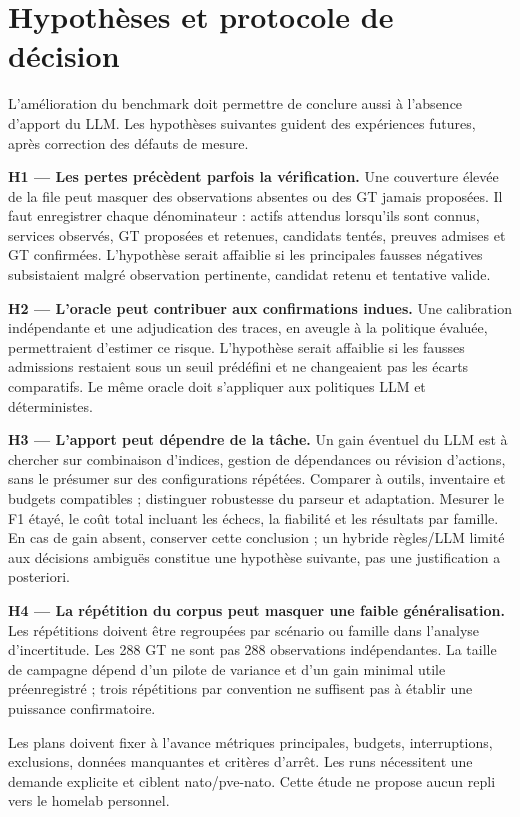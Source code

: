 \documentclass[11pt,a4paper]{article}
\begin{document}
\section{Hypothèses et protocole de décision}
\label{sec:protocol}
L'amélioration du benchmark doit permettre de conclure aussi à l'absence d'apport du LLM. Les hypothèses suivantes guident des expériences futures, après correction des défauts de mesure.

\textbf{H1 --- Les pertes précèdent parfois la vérification.} Une couverture élevée de la file peut masquer des observations absentes ou des GT jamais proposées. Il faut enregistrer chaque dénominateur : actifs attendus lorsqu'ils sont connus, services observés, GT proposées et retenues, candidats tentés, preuves admises et GT confirmées. L'hypothèse serait affaiblie si les principales fausses négatives subsistaient malgré observation pertinente, candidat retenu et tentative valide.

\textbf{H2 --- L'oracle peut contribuer aux confirmations indues.} Une calibration indépendante et une adjudication des traces, en aveugle à la politique évaluée, permettraient d'estimer ce risque. L'hypothèse serait affaiblie si les fausses admissions restaient sous un seuil prédéfini et ne changeaient pas les écarts comparatifs. Le même oracle doit s'appliquer aux politiques LLM et déterministes.

\textbf{H3 --- L'apport peut dépendre de la tâche.} Un gain éventuel du LLM est à chercher sur combinaison d'indices, gestion de dépendances ou révision d'actions, sans le présumer sur des configurations répétées. Comparer à outils, inventaire et budgets compatibles ; distinguer robustesse du parseur et adaptation. Mesurer le F1 étayé, le coût total incluant les échecs, la fiabilité et les résultats par famille. En cas de gain absent, conserver cette conclusion ; un hybride règles/LLM limité aux décisions ambiguës constitue une hypothèse suivante, pas une justification a posteriori.

\textbf{H4 --- La répétition du corpus peut masquer une faible généralisation.} Les répétitions doivent être regroupées par scénario ou famille dans l'analyse d'incertitude. Les 288 GT ne sont pas 288 observations indépendantes. La taille de campagne dépend d'un pilote de variance et d'un gain minimal utile préenregistré ; trois répétitions par convention ne suffisent pas à établir une puissance confirmatoire.

Les plans doivent fixer à l'avance métriques principales, budgets, interruptions, exclusions, données manquantes et critères d'arrêt. Les runs nécessitent une demande explicite et ciblent nato/pve-nato. Cette étude ne propose aucun repli vers le homelab personnel.
\end{document}
